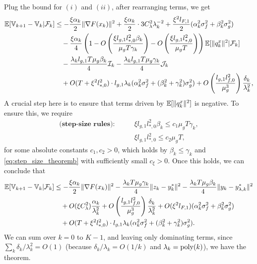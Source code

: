 Plug the bound for $(i)$ and $(ii)$, after rearranging terms, we get
\begin{align*}
    \mathbb{E}[\mathbb{V}_{k+1} - \mathbb{V}_k | \mathcal{F}_k] &\le - \frac{\xi \alpha_k}{2} \|\nabla F(x_k)\|^2  + \frac{\xi \alpha_k}{2} \cdot 3 C_\lambda^2 \lambda_k^{-2} +\frac{\xi^2 l_{F,1}}{2} (\alpha_k^2 \sigma_f^2 + \beta_k^2 \sigma_g^2) \\
    &\quad - \frac{\xi \alpha_k}{4} \left( 1 - O \left(\frac{\xi l_{g,1} l_{*,0}^2 \beta_k}{\mu_g T \gamma_k} \right) - O\left( \frac{\xi l_{g,1} l_{*,0}^2 }{\mu_g T} \right) \right) \mathbb{E}[\|q_k^x\|^2  |\mathcal{F}_k] \\
    &\quad - \frac{\lambda_k l_{g,1} T \mu_g \beta_k}{4} \mathcal{I}_k -\frac{\lambda_k l_{g,1} T 
    \mu_g \gamma_k}{4} \mathcal{J}_k \\
    &\quad +  O(T + \xi^2 l_{*,0}^2) \cdot l_{g,1} \lambda_k (\alpha_k^2 \sigma_f^2 + (\beta_k^2 + \gamma_k^2) \sigma_g^2) + O\left(\frac{l_{g,1} l_{f,0}^2}{\mu_g^3} \right) \frac{\delta_k}{\lambda_k^2},
\end{align*}
A crucial step here is to ensure that terms driven by $\mathbb{E}[\|q_k^x\|^2]$ is negative. %
To ensure this, we require 
\begin{align*}
    \textbf{(step-size rules):} \qquad &\xi l_{g,1} l_{*,0}^2 \beta_k \le c_1 \mu_g T \gamma_k, \nonumber \\ 
    & \xi l_{g,1} l_{*,0}^2 \le c_2 \mu_g T , 
\end{align*}
for some absolute constants $c_1, c_2 > 0$, which holds by $\beta_k \le \gamma_k$ and \eqref{eq:step_size_theoremb} with sufficiently small $c_\xi > 0$. Once this holds, we can conclude that 
\begin{align*}
    \mathbb{E}[\mathbb{V}_{k+1} - \mathbb{V}_k | \mathcal{F}_k] &\le - \frac{\xi \alpha_k}{2} \|\nabla F(x_k)\|^2 - \frac{\lambda_k T \mu_g \gamma_k}{4} \|z_k - y_k^*\|^2 - \frac{\lambda_k T \mu_g \beta_k}{4} \|y_k - y_{\lambda,k}^*\|^2 \nonumber \\
    &\quad + O(\xi C_{\lambda}^2) \frac{\alpha_k}{\lambda_k^2} + O\left(\frac{l_{g,1} l_{f,0}^2}{\mu_g^3} \right) \frac{\delta_k}{\lambda_k^2} + O(\xi^2 l_{F,1}) (\alpha_k^2 \sigma_f^2 + \beta_k^2 \sigma_g^2) \nonumber \\
    &\quad + O(T + \xi^2 l_{*,0}^2) \cdot l_{g,1} \lambda_k (\alpha_k^2 \sigma_f^2 + (\beta_k^2 + \gamma_k^2) \sigma_g^2).
\end{align*}
We can sum over $k=0$ to $K-1$, and leaving only dominating terms, since $\sum_k \delta_k / \lambda_k^2 = O(1)$ (because $\delta_k / \lambda_k = O(1/k)$ and $\lambda_k = \mathrm{poly}(k)$), we have the theorem.

